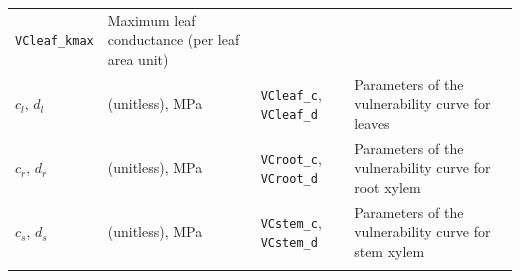 \documentclass[]{book}
\begin{document}
\begin{longtable}[]{@{}llll@{}}
\begin{minipage}[t]{0.12\columnwidth}
\texttt{VCleaf\_kmax}\strut
\end{minipage} & \begin{minipage}[t]{0.45\columnwidth}\raggedright
Maximum leaf conductance (per leaf area unit)\strut
\end{minipage}\tabularnewline
\begin{minipage}[t]{0.11\columnwidth}\raggedright
\(c_l\), \(d_l\)\strut
\end{minipage} & \begin{minipage}[t]{0.10\columnwidth}\raggedright
(unitless), MPa\strut
\end{minipage} & \begin{minipage}[t]{0.12\columnwidth}\raggedright
\texttt{VCleaf\_c}, \texttt{VCleaf\_d}\strut
\end{minipage} & \begin{minipage}[t]{0.45\columnwidth}\raggedright
Parameters of the vulnerability curve for leaves\strut
\end{minipage}\tabularnewline
\begin{minipage}[t]{0.11\columnwidth}\raggedright
\(c_r\), \(d_r\)\strut
\end{minipage} & \begin{minipage}[t]{0.10\columnwidth}\raggedright
(unitless), MPa\strut
\end{minipage} & \begin{minipage}[t]{0.12\columnwidth}\raggedright
\texttt{VCroot\_c}, \texttt{VCroot\_d}\strut
\end{minipage} & \begin{minipage}[t]{0.45\columnwidth}\raggedright
Parameters of the vulnerability curve for root xylem\strut
\end{minipage}\tabularnewline
\begin{minipage}[t]{0.11\columnwidth}\raggedright
\(c_s\), \(d_s\)\strut
\end{minipage} & \begin{minipage}[t]{0.10\columnwidth}\raggedright
(unitless), MPa\strut
\end{minipage} & \begin{minipage}[t]{0.12\columnwidth}\raggedright
\texttt{VCstem\_c}, \texttt{VCstem\_d}\strut
\end{minipage} & \begin{minipage}[t]{0.45\columnwidth}\raggedright
Parameters of the vulnerability curve for stem xylem\strut
\end{minipage}\tabularnewline
\begin{minipage}[t]{0.11\columnwidth}\raggedright

\end{minipage}
\end{longtable}
\end{document}
